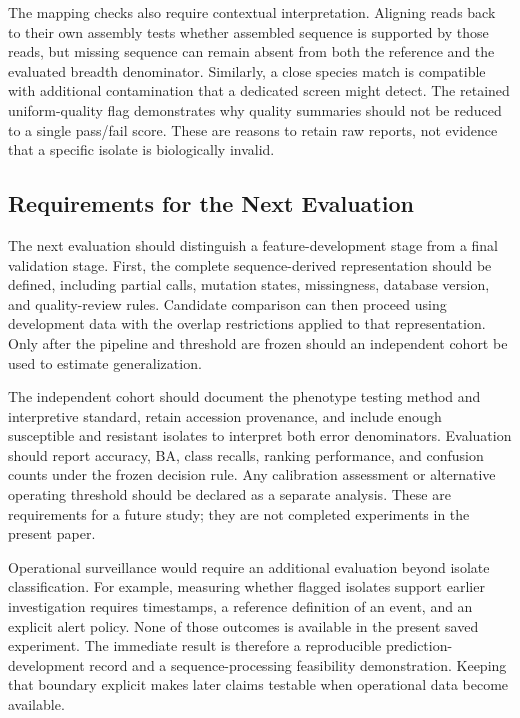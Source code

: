 The mapping checks also require contextual interpretation. Aligning reads back to their own assembly tests whether assembled sequence is supported by those reads, but missing sequence can remain absent from both the reference and the evaluated breadth denominator. Similarly, a close species match is compatible with additional contamination that a dedicated screen might detect. The retained uniform-quality flag demonstrates why quality summaries should not be reduced to a single pass/fail score. These are reasons to retain raw reports, not evidence that a specific isolate is biologically invalid.

\subsection{Requirements for the Next Evaluation}
The next evaluation should distinguish a feature-development stage from a final validation stage. First, the complete sequence-derived representation should be defined, including partial calls, mutation states, missingness, database version, and quality-review rules. Candidate comparison can then proceed using development data with the overlap restrictions applied to that representation. Only after the pipeline and threshold are frozen should an independent cohort be used to estimate generalization.

The independent cohort should document the phenotype testing method and interpretive standard, retain accession provenance, and include enough susceptible and resistant isolates to interpret both error denominators. Evaluation should report accuracy, BA, class recalls, ranking performance, and confusion counts under the frozen decision rule. Any calibration assessment or alternative operating threshold should be declared as a separate analysis. These are requirements for a future study; they are not completed experiments in the present paper.

Operational surveillance would require an additional evaluation beyond isolate classification. For example, measuring whether flagged isolates support earlier investigation requires timestamps, a reference definition of an event, and an explicit alert policy. None of those outcomes is available in the present saved experiment. The immediate result is therefore a reproducible prediction-development record and a sequence-processing feasibility demonstration. Keeping that boundary explicit makes later claims testable when operational data become available.

